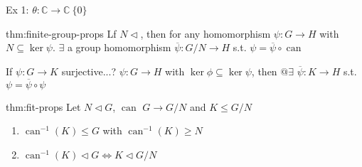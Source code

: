 \documentclass{article}
\DeclareMathOperator{\can}{can}
\begin{document}
Ex 1: $\theta : \mathbb{C} \to \mathbb{C} \ \{0\}$

\begin{thm}{thm:finite-group-props}{}
    Lf $N \triangleleft$, then for any homomorphism $\psi : G \to H$ with $N \subseteq \ker \psi$. $\exists$ a group homomorphism $\overline{\psi} : G /N \to H$ s.t. $\psi = \overline{\psi} \circ \can$

    \longrule{0.08ex}

    If $\psi : G \to K$ surjective...? $\psi : G \to H$ with $\ker \phi \subseteq \ker \psi$, then $@\exists$ $\overline{\psi} : K \to H$ s.t. $\psi = \overline{\psi} \circ \psi$
\end{thm}

\begin{thm}[]{thm:fit-props}{}
    Let $N \triangleleft G$, $\can$ $G \to G /N$ and $K \le G /N$
    \begin{enumerate}
        \item $\can^{-1}(K) \le G$ with $\can^{-1}(K) \ge N$
        \item $\can^{-1}(K) \triangleleft G \iff K \triangleleft G /N$
    \end{enumerate}
\end{thm}
\end{document}
